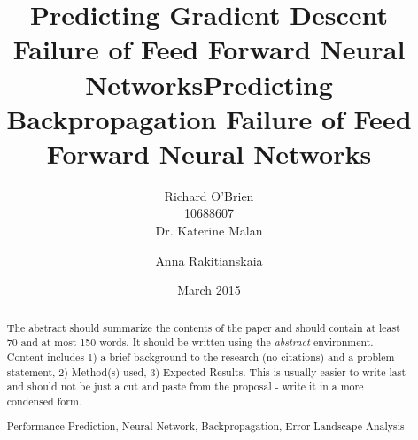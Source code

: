 \documentclass[runningheads,a4paper]{llncs}
\newcommand{\keywords}[1]{\par\addvspace\baselineskip
\noindent\keywordname\enspace\ignorespaces#1}
\begin{document}
\mainmatter  %

\title{Predicting Gradient Descent Failure of Feed Forward Neural Networks}



%
%
\author{Richard O'Brien \\ 10688607 \\
Dr. Katerine Malan\and Anna Rakitianskaia}



%
%

\date{March 2015}
\newpage

\title{Predicting Backpropagation Failure of Feed Forward Neural Networks}
\author{}
\institute{}


\maketitle

\begin{abstract}
The abstract should summarize the contents of the paper and should
contain at least 70 and at most 150 words. It should be written using the
\emph{abstract} environment. Content includes 1) a brief background to the research (no citations) and
a problem statement, 2) Method(s) used, 3) Expected Results. This is usually easier to write last and
should not be just a cut and paste from the proposal - write it in a more condensed form.

\keywords{Performance Prediction, Neural Network, Backpropagation, Error Landscape Analysis}
\end{abstract}
\end{document}
